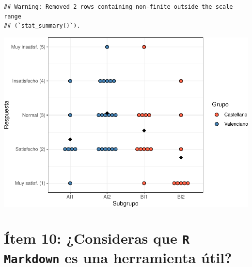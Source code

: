 \documentclass[
]{article}
\begin{document}
\begin{verbatim}
## Warning: Removed 2 rows containing non-finite outside the scale range
## (`stat_summary()`).
\end{verbatim}

\includegraphics{informe_files/figure-latex/unnamed-chunk-10-1.pdf}

\hypertarget{uxedtem-10-consideras-que-es-una-herramienta-uxfatil}{%
\section{\texorpdfstring{Ítem 10: ¿Consideras que \texttt{R Markdown} es
una herramienta
útil?}{Ítem 10: ¿Consideras que  es una herramienta útil?}}\label{uxedtem-10-consideras-que-es-una-herramienta-uxfatil}}
\end{document}
